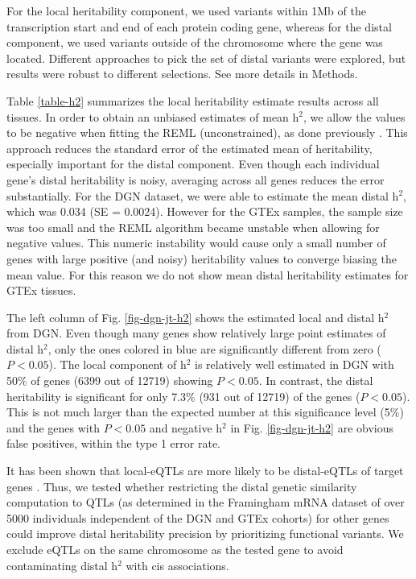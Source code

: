 \documentclass[10pt,letterpaper]{article}
\begin{document}
For the local heritability component, we used variants within 1Mb of the transcription start and end of each protein coding gene, whereas for the distal component, we used variants outside of the chromosome where the gene was located. Different approaches to pick the set of distal variants were explored, but results were robust to different selections. See more details in Methods.

Table \ref{table-h2} summarizes the local heritability estimate results across all tissues. In order to obtain an unbiased estimates of mean h$^2$, we allow the values to be negative when fitting the REML (unconstrained), as done previously \cite{Price_2011,Wright_2014}. This approach reduces the standard error of the estimated mean of heritability, especially important for the distal component. Even though each individual gene's distal heritability is noisy, averaging across all genes reduces the error substantially. For the DGN dataset, we were able to estimate the mean distal h$^2$, which was 0.034 (SE = 0.0024). However for the GTEx samples, the sample size was too small and the REML algorithm became unstable when allowing for negative values. This numeric instability would cause only a small number of genes with large positive (and noisy) heritability values to converge biasing the mean value. For this reason we do not show mean distal heritability estimates for GTEx tissues. 

The left column of Fig. \ref{fig-dgn-jt-h2} shows the estimated local and distal h$^2$ from DGN. Even though many genes show relatively large point estimates of distal h$^2$, only the ones colored in blue are significantly different from zero ($P < 0.05$). The local component of h$^2$ is relatively well estimated in DGN with 50\% of genes  (6399 out of 12719) showing $P < 0.05$. %
 In contrast, the distal heritability is significant for only 7.3\% (931 out of 12719) of the genes ($P < 0.05$). This is not much larger than the expected number at this significance level (5\%) and the genes with $P<0.05$ and negative h$^2$ in Fig. \ref{fig-dgn-jt-h2} are obvious false positives, within the type 1 error rate.

It has been shown that local-eQTLs are more likely to be distal-eQTLs of target genes \cite{pierce2014mediation}. Thus, we tested whether restricting the distal genetic similarity computation to QTLs (as determined in the Framingham mRNA dataset of over 5000 individuals \cite{Zhang_2015}  independent of the DGN and GTEx cohorts) for other genes could improve distal heritability precision by prioritizing functional variants. We exclude eQTLs on the same chromosome as the tested gene to avoid contaminating distal h$^2$ with cis associations.
\end{document}
